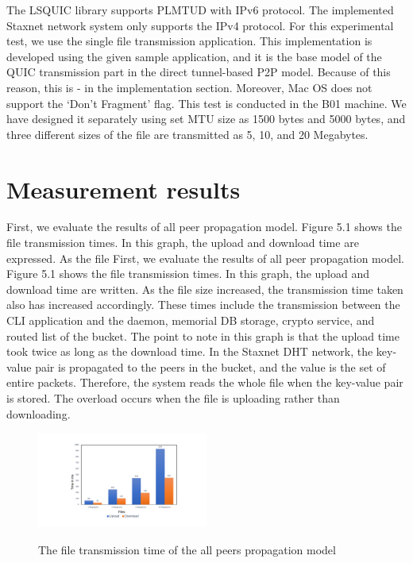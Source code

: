 The LSQUIC library supports PLMTUD with IPv6 protocol. The implemented Staxnet network system only supports the IPv4 protocol. For this experimental test, we use the single file transmission application. This implementation is developed using the given sample application, and it is the base model of the QUIC transmission part in the direct tunnel-based P2P model. Because of this reason, this is - in the implementation section. Moreover, Mac OS does not support the ‘Don’t Fragment’ flag. This test is conducted in the B01 machine. We have designed it separately using set MTU size as 1500 bytes and 5000 bytes, and three different sizes of the file are transmitted as 5, 10, and 20 Megabytes.

\section{Measurement results}

First, we evaluate the results of all peer propagation model. Figure 5.1 shows the file transmission times. In this graph, the upload and download time are expressed. As the file First, we evaluate the results of all peer propagation model. Figure 5.1 shows the file transmission times. In this graph, the upload and download time are written. As the file size increased, the transmission time taken also has increased accordingly. These times include the transmission between the CLI application and the daemon, memorial DB storage, crypto service, and routed list of the bucket. The point to note in this graph is that the upload time took twice as long as the download time. In the Staxnet DHT network, the key-value pair is propagated to the peers in the bucket, and the value is the set of entire packets. Therefore, the system reads the whole file when the key-value pair is stored. The overload occurs when the file is uploading rather than downloading.

\begin{figure}[!ht]
	\centering
	\includegraphics[width=0.5\textwidth]{images/fig_5_1.pdf}\\
	\caption{The file transmission time of the all peers propagation model}
	\label{fig:allpeers}
\end{figure}

